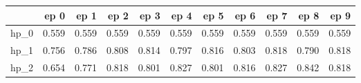 \begin{tabular}{lrrrrrrrrrr}
\toprule
{} &   ep 0 &   ep 1 &   ep 2 &   ep 3 &   ep 4 &   ep 5 &   ep 6 &   ep 7 &   ep 8 &   ep 9 \\
\midrule
hp\_0 &  0.559 &  0.559 &  0.559 &  0.559 &  0.559 &  0.559 &  0.559 &  0.559 &  0.559 &  0.559 \\
hp\_1 &  0.756 &  0.786 &  0.808 &  0.814 &  0.797 &  0.816 &  0.803 &  0.818 &  0.790 &  0.818 \\
hp\_2 &  0.654 &  0.771 &  0.818 &  0.801 &  0.827 &  0.801 &  0.816 &  0.827 &  0.842 &  0.818 \\
\bottomrule
\end{tabular}
